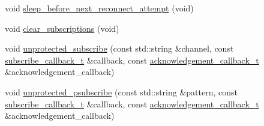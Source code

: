 \begin{DoxyCompactItemize}
void \hyperlink{classcpp__redis_1_1subscriber_aa4a227745820990bfed151f51376ac54}{sleep\+\_\+before\+\_\+next\+\_\+reconnect\+\_\+attempt} (void)
\item 
void \hyperlink{classcpp__redis_1_1subscriber_a1be9e272e3b9d382e9b6c75c0c4bce70}{clear\+\_\+subscriptions} (void)
\item 
void \hyperlink{classcpp__redis_1_1subscriber_adc7f57c1c2cba9b213ce251b2b736550}{unprotected\+\_\+subscribe} (const std\+::string \&channel, const \hyperlink{classcpp__redis_1_1subscriber_ac6ab8ebc526d784e4b79a39bbd73dca8}{subscribe\+\_\+callback\+\_\+t} \&callback, const \hyperlink{classcpp__redis_1_1subscriber_a19ea39dfabeb19937a9ce4c8d21781b4}{acknowledgement\+\_\+callback\+\_\+t} \&acknowledgement\+\_\+callback)
\item 
void \hyperlink{classcpp__redis_1_1subscriber_a4c711c3fda605cb286f14bb25b205b7d}{unprotected\+\_\+psubscribe} (const std\+::string \&pattern, const \hyperlink{classcpp__redis_1_1subscriber_ac6ab8ebc526d784e4b79a39bbd73dca8}{subscribe\+\_\+callback\+\_\+t} \&callback, const \hyperlink{classcpp__redis_1_1subscriber_a19ea39dfabeb19937a9ce4c8d21781b4}{acknowledgement\+\_\+callback\+\_\+t} \&acknowledgement\+\_\+callback)
\end{DoxyCompactItemize}
